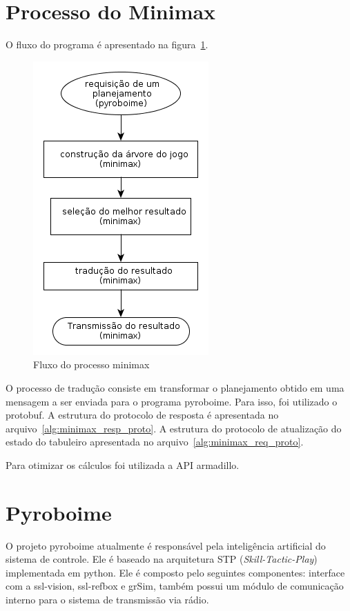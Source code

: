 \section{Processo do Minimax}\label{sec:minimax}

O fluxo do programa é apresentado na figura~\ref{fig:minimax_flow}.

\begin{figure}
  \centering
  \includegraphics[width=0.2 \linewidth]{img/minimax_flow}
  \caption{Fluxo do processo minimax}\label{fig:minimax_flow}
\end{figure}

O processo de tradução consiste em transformar o planejamento obtido em uma
mensagem a ser enviada para o programa pyroboime. Para isso, foi utilizado o
protobuf. A estrutura do protocolo de resposta é apresentada no
arquivo~\ref{alg:minimax_resp_proto}. A estrutura do protocolo de atualização do
estado do tabuleiro apresentada no arquivo~\ref{alg:minimax_req_proto}.

Para otimizar os cálculos foi utilizada a API armadillo.





\section{Pyroboime}\label{sec:pyroboime}

O projeto pyroboime atualmente é responsável pela inteligência artificial do
sistema de controle. Ele é baseado na arquitetura STP
(\textit{Skill-Tactic-Play}) implementada em python.
Ele é composto pelo seguintes componentes: interface com a ssl-vision,
ssl-refbox e grSim, também possui um módulo de comunicação interno para o
sistema de transmissão via rádio.

